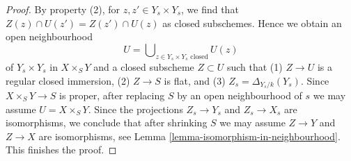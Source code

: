 \documentclass{stacks-project}
\theoremstyle{plain}
\theoremstyle{definition}
\theoremstyle{remark}
\numberwithin{equation}{subsection}
\begin{document}
\begin{proof}
\noindent
By property (2), for $z, z' \in Y_s \times Y_s$, we
find that $Z(z) \cap U(z') = Z(z') \cap U(z)$ as closed subschemes.
Hence we obtain an open neighbourhood
$$
U = \bigcup\nolimits_{z \in Y_s \times Y_s\text{ closed}} U(z)
$$
of $Y_s \times Y_s$ in $X \times_S Y$ and a closed subscheme $Z \subset U$
such that (1) $Z \to U$ is a regular closed immersion,
(2) $Z \to S$ is flat, and (3) $Z_s = \Delta_{Y_s/k}(Y_s)$.
Since $X \times_S Y \to S$ is proper, after replacing $S$
by an open neighbourhood of $s$ we may assume $U = X \times_S Y$.
Since the projections $Z_s \to Y_s$ and $Z_s \to X_s$
are isomorphisms, we conclude that after shrinking $S$
we may assume $Z \to Y$ and $Z \to X$ are isomorphisms, see
Lemma \ref{lemma-isomorphism-in-neighbourhood}.
This finishes the proof.
\end{proof}
\end{document}
